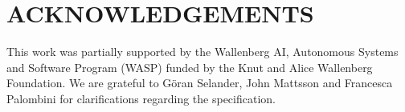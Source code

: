 \documentclass[runningheads]{llncs}
\begin{document}
\section*{ACKNOWLEDGEMENTS}
This work was partially supported by
the Wallenberg AI, Autonomous Systems and Software Program (WASP) funded by
the Knut and Alice Wallenberg Foundation.
%
We are grateful to G\"oran Selander, John Mattsson and Francesca Palombini for
clarifications regarding the specification.
%


{\small
    
}
\end{document}
